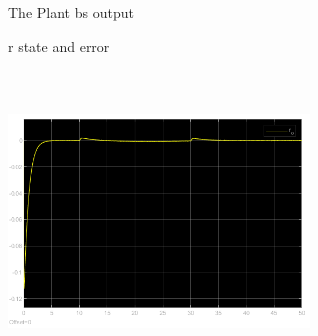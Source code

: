 \documentclass[12pt, a4paper]{article}
\begin{document}
\begin{enumerate}[1.]
\begin{figure}[H]
    \caption{The Plant bs output}
    \label{fig:label}
    \end{figure}    
    \begin{figure}[H]
        \centering
        \qquad
        \caption{r state and error}
        \label{fig:example}%
    \end{figure}
\begin{figure}[H]
    \centering
    \includegraphics[width=8cm,height=8cm,scale=0.6]{r_o.png}

\end{figure}
\end{enumerate}
\end{document}
